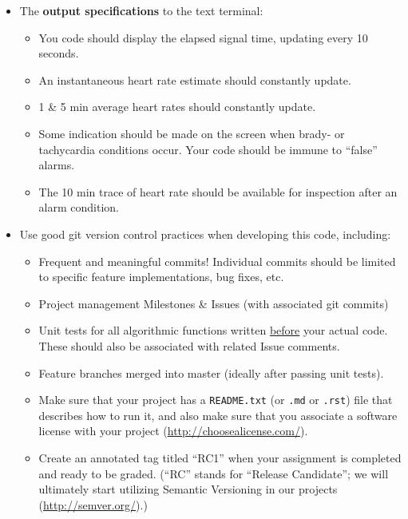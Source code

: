 \begin{itemize}
\item The \textbf{output specifications} to the text terminal:
\begin{itemize}
    \item You code should display the elapsed signal time, updating every 10 seconds.
    \item An instantaneous heart rate estimate should constantly update.
    \item 1 \& 5 min average heart rates should constantly update.
    \item Some indication should be made on the screen when brady- or tachycardia conditions occur.  Your code should be immune to ``false'' alarms.
    \item The 10 min trace of heart rate should be available for inspection after an alarm condition.
\end{itemize}

\item Use good git version control practices when developing this code, including:
\begin{itemize}
    \item Frequent and meaningful commits!  Individual commits should be limited to specific feature implementations, bug fixes, etc.
    \item Project management Milestones \& Issues (with associated git commits)
    \item Unit tests for all algorithmic functions written \underline{before} your actual code.  These should also be associated with related Issue comments.
    \item Feature branches merged into master (ideally after passing unit tests).
    \item Make sure that your project has a \verb+README.txt+ (or \verb+.md+ or \verb+.rst+) file that describes how to run it, and also make sure that you associate a software license with your project (\url{http://choosealicense.com/}).
    \item Create an annotated tag titled ``RC1'' when your assignment is completed and ready to be graded.  (``RC'' stands for ``Release Candidate''; we will ultimately start utilizing Semantic Versioning in our projects (\url{http://semver.org/}).)
\end{itemize}


\end{itemize}

